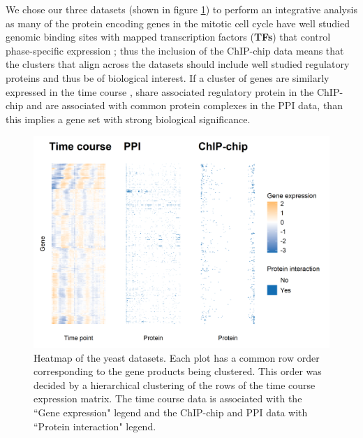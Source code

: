\documentclass[]{article}
\begin{document}
We chose our three datasets (shown in figure \ref{fig:yeastData}) to perform an integrative analysis as many of the protein encoding genes in the mitotic cell cycle have well studied genomic binding sites with mapped transcription factors (\textbf{TFs}) that control phase-specific expression \citep{cho1998genome, spellman1998comprehensive}; thus the inclusion of the ChIP-chip data means that the clusters that align across the datasets should include well studied regulatory proteins and thus be of biological interest. If a cluster of genes are similarly expressed in the time course , share associated regulatory protein in the ChIP-chip and are associated with common protein complexes in the PPI data, than this implies a gene set with strong biological significance.
\begin{figure}
	\centering
	\includegraphics[scale=0.7]{./Images/Yeast/yeastData.png}
	\caption{Heatmap of the yeast datasets. Each plot has a common row order corresponding to the gene products being clustered. This order was decided by a hierarchical clustering of the rows of the time course  expression matrix. The time course  data is associated with the ``Gene expression" legend and the ChIP-chip and PPI data with ``Protein interaction" legend.}
	\label{fig:yeastData}
\end{figure}
\end{document}

